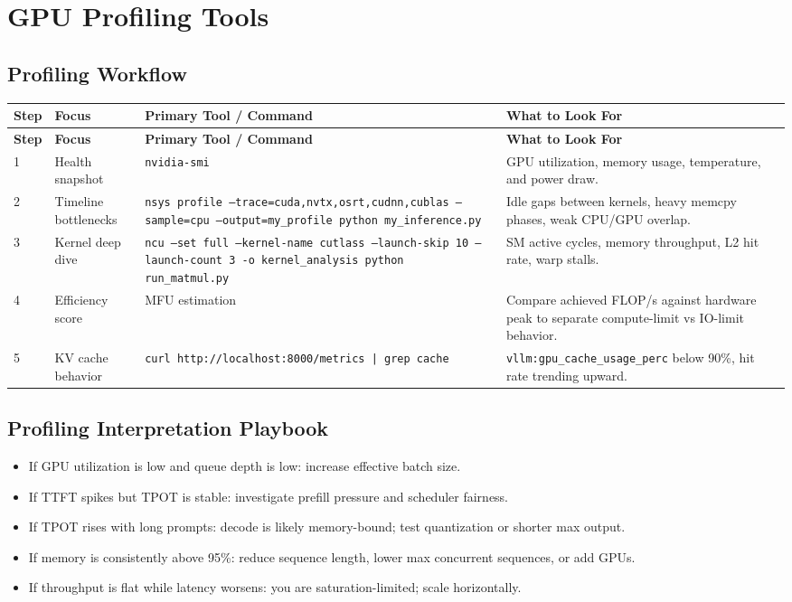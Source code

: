 \documentclass[10pt, oneside, openany]{book}
\newcommand{\code}[1]{\texttt{#1}}
\begin{document}
\chapter{GPU Profiling Tools}
\label{app:profiling}

\section*{Profiling Workflow}

\begin{longtable}{@{}p{1.1cm}p{3.2cm}p{4.8cm}p{4.2cm}@{}}
  \toprule
  \textbf{Step} & \textbf{Focus} & \textbf{Primary Tool / Command} & \textbf{What to Look For} \\
  \midrule
  \endfirsthead
  \toprule
  \textbf{Step} & \textbf{Focus} & \textbf{Primary Tool / Command} & \textbf{What to Look For} \\
  \midrule
  \endhead
  1 & Health snapshot & \code{nvidia-smi} & GPU utilization, memory usage, temperature, and power draw. \\
  2 & Timeline bottlenecks & \code{nsys profile --trace=cuda,nvtx,osrt,cudnn,cublas --sample=cpu --output=my\_profile python my\_inference.py} & Idle gaps between kernels, heavy memcpy phases, weak CPU/GPU overlap. \\
  3 & Kernel deep dive & \code{ncu --set full --kernel-name cutlass --launch-skip 10 --launch-count 3 -o kernel\_analysis python run\_matmul.py} & SM active cycles, memory throughput, L2 hit rate, warp stalls. \\
  4 & Efficiency score & MFU estimation & Compare achieved FLOP/s against hardware peak to separate compute-limit vs IO-limit behavior. \\
  5 & KV cache behavior & \code{curl http://localhost:8000/metrics | grep cache} & \code{vllm:gpu\_cache\_usage\_perc} below 90\%, hit rate trending upward. \\
  \bottomrule
\end{longtable}

\section*{Profiling Interpretation Playbook}

\begin{itemize}
  \item If GPU utilization is low and queue depth is low: increase effective batch size.
  \item If TTFT spikes but TPOT is stable: investigate prefill pressure and scheduler fairness.
  \item If TPOT rises with long prompts: decode is likely memory-bound; test quantization or shorter max output.
  \item If memory is consistently above 95\%: reduce sequence length, lower max concurrent sequences, or add GPUs.
  \item If throughput is flat while latency worsens: you are saturation-limited; scale horizontally.
\end{itemize}
\end{document}
